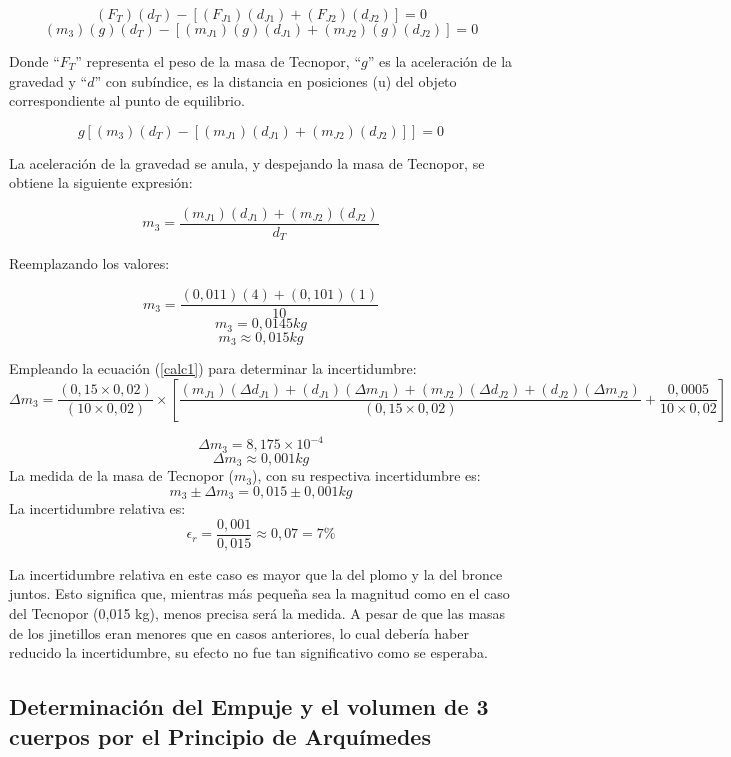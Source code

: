 \documentclass[../main.tex]{subfiles}
\begin{document}
\[(F_T)(d_T )-[(F_{J1} )(d_{J1} )+(F_{J2} )(d_{J2} )]=0\]
\[(m_3)(g)(d_T )-[(m_{J1} )(g)(d_{J1} )+(m_{J2} )(g)(d_{J2} )]=0\]

Donde “$F_T$” representa el peso de la masa de Tecnopor, “$g$”
es la aceleración de la gravedad y “$d$” con subíndice,
es la distancia en posiciones (u) del objeto correspondiente al 
punto de equilibrio.

\[g[(m_3)(d_T )-[(m_{J1} )(d_{J1} )+(m_{J2} )(d_{J2} )]]=0\]

La aceleración de la gravedad se anula, y despejando la masa de 
Tecnopor, 
se obtiene la siguiente expresión:

\begin{equation*}
    m_3=\frac{(m_{J1} )(d_{J1} )+(m_{J2} )(d_{J2} )}{d_T} 
\end{equation*}

Reemplazando los valores:

\[m_3=\frac{(0,011)(4)+(0,101)(1)}{10}\]
\[m_3=0,0145 kg\]
\[m_3\approx0,015 kg\]

Empleando la ecuación (\ref{calc1}) para determinar la incertidumbre:
\begin{equation*}
    \Delta m_3=\frac{(0,15\times0,02)}{(10\times0,02)}\times
    \left[\frac{(m_{J1} )(\Delta d_{J1} )+(d_{J1} )(\Delta m_{J1} )+
    (m_{J2} )(\Delta d_{J2} )+(d_{J2} )(\Delta m_{J2} )}{(0,15\times0,02)}
    +\frac{0,0005}{10\times0,02}\right]
\end{equation*}

\[\Delta m_3=8,175\times10^{-4}\]
\[\Delta m_3\approx0,001 kg\]
La medida de la masa de Tecnopor ($m_3$), 
con su respectiva incertidumbre es:
\[m_3\pm\Delta m_3=0,015\pm0,001 kg\]
La incertidumbre relativa es:
\[\epsilon_r=\frac{0,001}{0,015}\approx0,07=7\%\]

La incertidumbre relativa en este caso es mayor que la del plomo 
y la del bronce juntos. Esto significa que, mientras más 
pequeña sea la magnitud como en el caso del 
Tecnopor (0,015 kg), menos precisa será la medida. 
A pesar de que las masas de los jinetillos eran menores que en 
casos anteriores, lo cual debería haber reducido la incertidumbre, 
su efecto no fue tan significativo como se esperaba.

\subsection{Determinación del Empuje y el volumen de 3 cuerpos por el Principio de Arquímedes}
\end{document}
